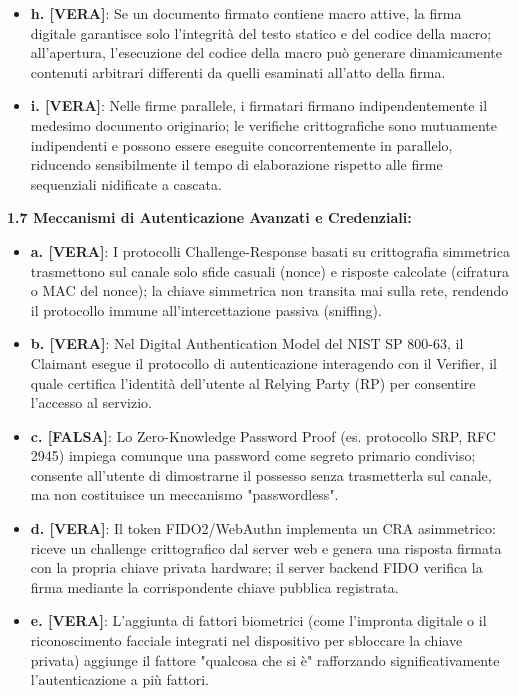 \documentclass[11pt,a4paper]{article}
\begin{document}
\begin{solutionbox}
\begin{itemize}
    \item \textbf{h. [VERA]}: Se un documento firmato contiene macro attive, la firma digitale garantisce solo l'integrità del testo statico e del codice della macro; all'apertura, l'esecuzione del codice della macro può generare dinamicamente contenuti arbitrari differenti da quelli esaminati all'atto della firma.
    \item \textbf{i. [VERA]}: Nelle firme parallele, i firmatari firmano indipendentemente il medesimo documento originario; le verifiche crittografiche sono mutuamente indipendenti e possono essere eseguite concorrentemente in parallelo, riducendo sensibilmente il tempo di elaborazione rispetto alle firme sequenziali nidificate a cascata.
\end{itemize}

\textbf{1.7 Meccanismi di Autenticazione Avanzati e Credenziali:}
\begin{itemize}
    \item \textbf{a. [VERA]}: I protocolli Challenge-Response basati su crittografia simmetrica trasmettono sul canale solo sfide casuali (nonce) e risposte calcolate (cifratura o MAC del nonce); la chiave simmetrica non transita mai sulla rete, rendendo il protocollo immune all'intercettazione passiva (sniffing).
    \item \textbf{b. [VERA]}: Nel Digital Authentication Model del NIST SP 800-63, il Claimant esegue il protocollo di autenticazione interagendo con il Verifier, il quale certifica l'identità dell'utente al Relying Party (RP) per consentire l'accesso al servizio.
    \item \textbf{c. [FALSA]}: Lo Zero-Knowledge Password Proof (es. protocollo SRP, RFC 2945) impiega comunque una password come segreto primario condiviso; consente all'utente di dimostrarne il possesso senza trasmetterla sul canale, ma non costituisce un meccanismo "passwordless".
    \item \textbf{d. [VERA]}: Il token FIDO2/WebAuthn implementa un CRA asimmetrico: riceve un challenge crittografico dal server web e genera una risposta firmata con la propria chiave privata hardware; il server backend FIDO verifica la firma mediante la corrispondente chiave pubblica registrata.
    \item \textbf{e. [VERA]}: L'aggiunta di fattori biometrici (come l'impronta digitale o il riconoscimento facciale integrati nel dispositivo per sbloccare la chiave privata) aggiunge il fattore "qualcosa che si è" rafforzando significativamente l'autenticazione a più fattori.

\end{itemize}
\end{solutionbox}
\end{document}
